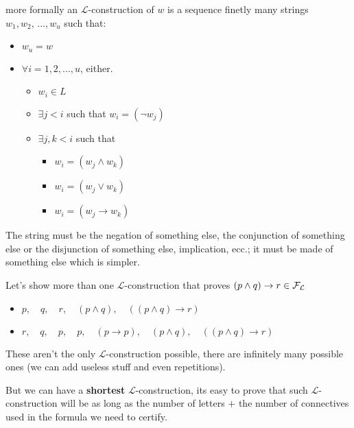 	more formally an $\mathcal{L}$-construction of $w$ is a sequence finetly many strings $w_1, w_2, \, ..., w_{u}$ such that:
	\begin{itemize}
		\item $w_u = w$
		\item $\forall i =  1,2, ... , u$, either.
		\begin{itemize}
			\item $w_i \in L$
			\item $\exists j<i$ such that $w_i = (\neg w_j)$
			\item $\exists j,k < i$ such that
			\begin{itemize}[label=]
				\item $w_i = (w_j \wedge w_k)$
				\item $w_i = (w_j \vee w_k)$
				\item $w_i = (w_j \rightarrow w_k)$
			\end{itemize}
		\end{itemize}
	\end{itemize}

	The string must be the negation of something else, the conjunction of something else or the disjunction of something else, implication, ecc.; it must be made of something else which is simpler.

	\begin{example} Let's show more than one $\mathcal{L}$-construction that proves $(p \wedge q) \rightarrow r \in \mathcal{F}_\mathcal{L}$
	  \begin{itemize}
		\item $p, \quad q, \quad r, \quad (p \wedge q), \quad ((p \wedge q) \rightarrow r) $
		\item $r, \quad q, \quad p, \quad p, \quad (p \rightarrow p), \quad (p \wedge q), \quad ((p \wedge q) \rightarrow r) $
	  \end{itemize}
	\end{example}

	These aren't the only $\mathcal{L}$-construction possible, there are infinitely many possible ones (we can add useless stuff and even repetitions).

	But we can have a \textbf{shortest} $\mathcal{L}$-construction, its easy to prove that such $\mathcal{L}$-construction will be as long as the number of letters $+$ the number of connectives used in the formula we need to certify.

